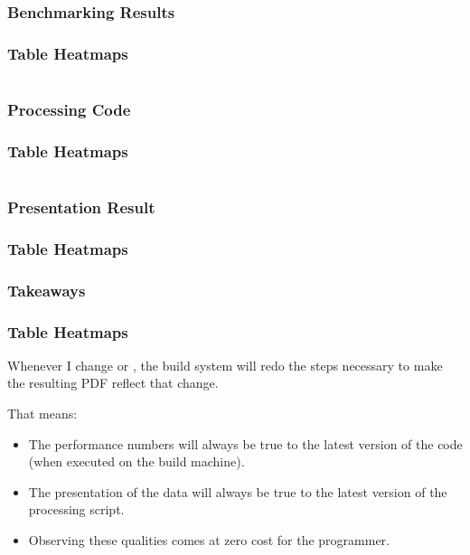 {\subsubsection{Benchmarking Results}
\begin{frame}[fragile]
  \frametitle{Table Heatmaps }
  \vspace{-1mm}
  \inputminted[fontsize=\footnotesize]{text}{../src/table_heatmap/code.txt}
\end{frame}

\subsubsection{Processing Code}
\begin{frame}[fragile]
  \frametitle{Table Heatmaps }
  \vspace{-5mm}
  \begin{multicols}{2}
    \inputminted[fontsize=\tiny,breaklines]{python}{../src/table_heatmap/process.py}
  \end{multicols}
\end{frame}

\subsubsection{Presentation Result}
\begin{frame}[fragile]
  \frametitle{Table Heatmaps }
  \vspace{24mm}
  \scalebox{0.9}{
    
  }
\end{frame}

\subsubsection{Takeaways}
\begin{frame}[fragile]
  \frametitle{Table Heatmaps }
  \vspace{3mm}
  Whenever I change  or , the build system will redo the steps necessary to make the resulting PDF reflect that change.
  
  \vspace{5mm}
  That means:
  \begin{itemize}
    \item The performance numbers will always be true to the latest version of the code (when executed on the build machine).
    \item The presentation of the data will always be true to the latest version of the processing script.
    \item Observing these qualities comes at zero cost for the programmer.
  \end{itemize}
\end{frame}

}
